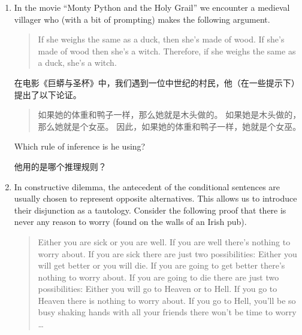\begin{enumerate}

    \item In the movie ``Monty Python and the Holy Grail'' we encounter
    a medieval villager who (with a bit of prompting) makes the 
    following argument.
    \begin{quote}
    If she weighs the same as a duck, then she's made of wood. \newline
    If she's made of wood then she's a witch. \newline
    Therefore, if she weighs the same as a duck, she's a witch.
    \end{quote} 
    
    在电影《巨蟒与圣杯》中，我们遇到一位中世纪的村民，他（在一些提示下）提出了以下论证。
    \begin{quote}
    如果她的体重和鸭子一样，那么她就是木头做的。\newline
    如果她是木头做的，那么她就是个女巫。\newline
    因此，如果她的体重和鸭子一样，她就是个女巫。
    \end{quote} 
    
    Which rule of inference is he using?
    
    他用的是哪个推理规则？
    
    
    \item In constructive dilemma, the antecedent of the conditional 
    sentences are usually chosen to represent opposite alternatives.
    This allows us to introduce their disjunction as a tautology.
    Consider the following proof that there is never any reason to worry
    (found on the walls of an Irish pub).
    \begin{quote}
    Either you are sick or you are well. \newline
    If you are well there's nothing to worry about. \newline
    If you are sick there are just two possibilities: \newline
    Either you will get better or you will die. \newline
    If you are going to get better there's nothing to worry about. \newline
    If you are going to die there are just two possibilities:\newline
    Either you will go to Heaven or to Hell. \newline
    If you go to Heaven there is nothing to worry about.
    If you go to Hell, you'll be so busy shaking hands with all your friends there won't be time to worry \ldots
    \end{quote}
    

\end{enumerate}
